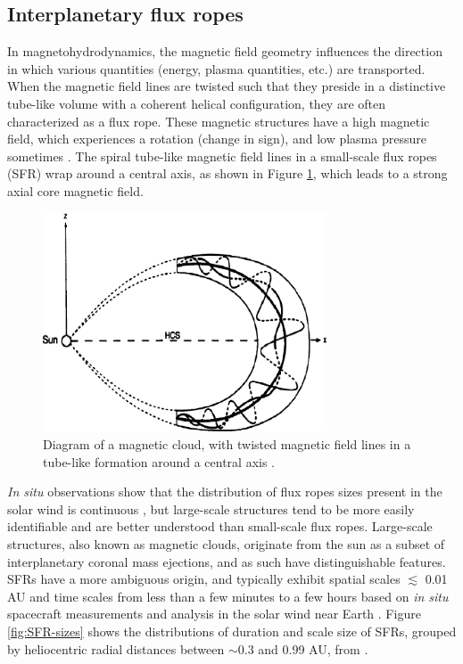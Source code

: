 

\subsection{Interplanetary flux ropes}
In magnetohydrodynamics, the magnetic field geometry influences the direction in which various quantities (energy, plasma quantities, etc.) are transported. When the magnetic field lines are twisted such that they preside in a distinctive tube-like volume with a coherent helical configuration, they are often characterized as a flux rope. These magnetic structures have a high magnetic field, which experiences a rotation (change in sign), and low plasma pressure sometimes \citep{Cartwright:2008}. The spiral tube-like magnetic field lines in a small-scale flux ropes (\gls{SFR}) wrap around a central axis, as shown in Figure \ref{fig:FR-diagram}, which leads to a strong axial core magnetic field.

\begin{figure}[ht!]
    \centering
    \includegraphics[width=0.75\textwidth]{Figures/fluxrope.png}
    \caption{Diagram of a magnetic cloud, with twisted magnetic field lines in a tube-like formation around a central axis \citep{Feng:2020}.}
    \label{fig:FR-diagram}
\end{figure}

\textit{In situ} observations show that the distribution of flux ropes sizes present in the solar wind is continuous \citep{Hu:2018}, but large-scale structures tend to be more easily identifiable and are better understood than small-scale flux ropes. Large-scale structures, also known as magnetic clouds, originate from the sun as a subset of interplanetary coronal mass ejections, and as such have distinguishable features. SFRs have a more ambiguous origin, and typically exhibit spatial scales $\lesssim$ 0.01 AU and time scales from less than a few minutes to a few hours based on \textit{in situ} spacecraft measurements and analysis in the solar wind near Earth \citep{Cartwright:2010, Feng:2007, Hu:2018}. Figure \ref{fig:SFR-sizes} shows the distributions of duration and scale size of SFRs, grouped by heliocentric radial distances between $\sim$0.3 and 0.99 AU, from \cite{ChenHu:2020}.

